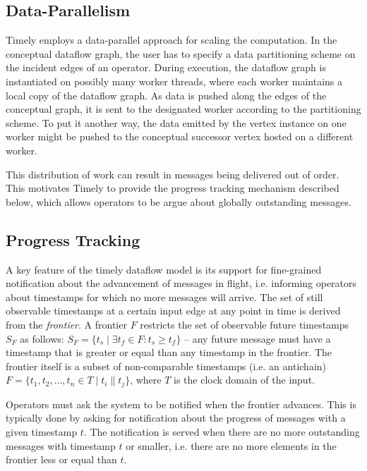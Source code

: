 \subsection{Data-Parallelism}

Timely employs a data-parallel approach for scaling the computation. In the
conceptual dataflow graph, the user has to specify a data partitioning scheme
on the incident edges of an operator. During execution, the dataflow graph
is instantiated on possibly many worker threads, where each worker maintains
a local copy of the dataflow graph. As data is pushed along the edges of the
conceptual graph, it is sent to the designated worker according to the
partitioning scheme. To put it another way, the data emitted by the vertex
instance on one worker might be pushed to the conceptual successor vertex
hosted on a different worker.

This distribution of work can result in messages being delivered out of
order. This motivates Timely to provide the progress tracking mechanism
described below, which allows operators to be argue about globally
outstanding messages.

\subsection{Progress Tracking}

A key feature of the timely dataflow model is its support for fine-grained notification
about the advancement of messages in flight, i.e. informing operators about
timestamps for which no more messages will arrive. The set of still observable
timestamps at a certain input edge at any point in time is derived from the \emph{frontier}.
A frontier $F$ restricts the set of observable future timestamps $S_F$ as follows:
$S_F = \{ t_s \mid \exists t_f \in F: t_s \geq t_f \}$ -- any future message must
have a timestamp that is greater or equal than any timestamp in the frontier.
The frontier itself is a subset of non-comparable timestamps (i.e. an antichain)
$F = \{t_1, t_2, \dots, t_n \in T \mid  t_i \parallel t_j \}$, where
$T$ is the clock domain of the input.

Operators must ask the system to be notified when the frontier advances. This
is typically done by asking for notification about the progress of messages with
a given timestamp $t$. The
notification is served when there are no more outstanding messages with
timestamp $t$ or smaller, i.e. there are no more elements in the frontier less
or equal than $t$.

